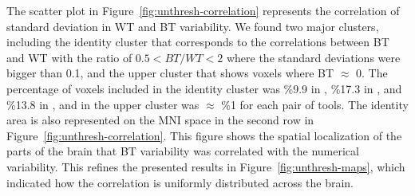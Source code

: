 \documentclass[conference]{IEEEtran}
\begin{document}
\begin{figure}[ht]
  \end{figure}


The scatter plot in Figure~\ref{fig:unthresh-correlation} represents the correlation of standard deviation in WT and BT variability.
We found two major clusters, including the identity cluster that corresponds to the correlations
between BT and WT with the ratio of $0.5 < BT/WT < 2$ where the standard deviations were bigger than 0.1,
and the upper cluster that shows voxels where BT $\approx$ 0.
The percentage of voxels included in the identity cluster was \%9.9 in \fslspm, \%17.3 in \fslafni, and \%13.8 in \afnispm,
and in the upper cluster was $\approx$ \%1 for each pair of tools.
The identity area is also represented on the MNI space in the second row in Figure~\ref{fig:unthresh-correlation}.
This figure shows the spatial localization of the parts of the brain that BT variability was correlated with the numerical variability.
This refines the presented results in Figure~\ref{fig:unthresh-maps},
which indicated how the correlation is uniformly distributed across the brain.
\end{document}
